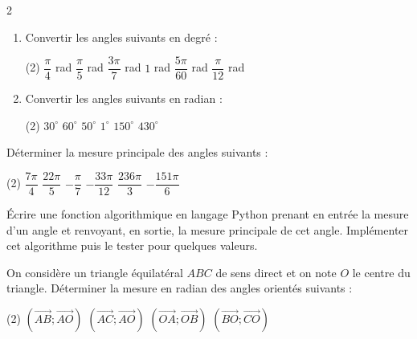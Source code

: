 \documentclass[a4paper,12pt]{article}
\begin{document}
\begin{multicols}{2}
  \begin{exercice}[title=Exercice 5 $\star$ { [Calculer] }]{}{}
    \begin{enumerate}
      \item Convertir les angles suivants en degré :
      \begin{tasks}[style=itemize](2)
        \task $\dfrac{\pi}{4}$ rad
        \task $\dfrac{\pi}{5}$ rad
        \task $\dfrac{3\pi}{7}$ rad
        \task $1$ rad
        \task $\dfrac{5\pi}{60}$ rad
        \task $\dfrac{\pi}{12}$ rad
      \end{tasks}
      \item Convertir les angles suivants en radian :
      \begin{tasks}[style=itemize](2)
        \task $30^\circ$
        \task $60^\circ$
        \task $50^\circ$
        \task $1^\circ$
        \task $150^\circ$
        \task $430^\circ$
      \end{tasks}
    \end{enumerate}
  \end{exercice}

  \begin{exercice}[title=Exercice 6 $\star$ { [Calculer] }]{}{}
    Déterminer la mesure principale des angles suivants :
    \begin{tasks}[style=itemize](2)
      \task $\dfrac{7\pi}{4}$
      \task $\dfrac{22\pi}{5}$
      \task $-\dfrac{\pi}{7}$
      \task $-\dfrac{33\pi}{12}$
      \task $\dfrac{236\pi}{3}$
      \task $-\dfrac{151\pi}{6}$
    \end{tasks}
    \end{exercice}
    
    \begin{exercice}[title=Exercice 7 $\star\star$ { [Représenter] }]{}{}
    Écrire une fonction algorithmique en langage Python prenant en entrée la mesure d’un angle et renvoyant, en sortie, la mesure principale de cet angle.  
    Implémenter cet algorithme puis le tester pour quelques valeurs.
    \end{exercice}
    

  \begin{exercice}[title=Exercice 8 $\star$ { [Chercher] }]{}{}
    On considère un triangle équilatéral $ABC$ de sens direct et on note $O$ le centre du triangle.
    Déterminer la mesure en radian des angles orientés suivants :
    \begin{tasks}[style=itemize](2)
      \task $(\overrightarrow{AB}; \overrightarrow{AO})$
      \task $(\overrightarrow{AC}; \overrightarrow{AO})$
      \task $(\overrightarrow{OA}; \overrightarrow{OB})$
      \task $(\overrightarrow{BO}; \overrightarrow{CO})$
    \end{tasks}
  \end{exercice}


\end{multicols}
\end{document}
